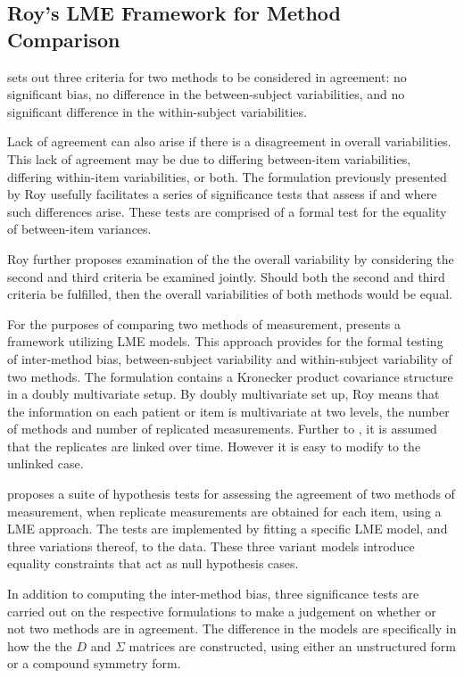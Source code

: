 \documentclass[12pt, a4paper]{report}
\theoremstyle{plain}
\theoremstyle{definition}
\theoremstyle{remark}
\begin{document}
\subsection{Roy's LME Framework for Method Comparison }
\citet{Barnhart} sets out three criteria for two methods to be considered in agreement: no significant bias, no difference in the between-subject variabilities, and no significant difference in the within-subject variabilities. 


Lack of agreement can also arise if there is a disagreement in overall variabilities. This lack of agreement may be due to differing between-item variabilities, differing within-item variabilities, or both. The formulation previously presented by Roy usefully facilitates a series of significance tests that assess if and where such differences arise. These tests are comprised of a formal test for the equality of between-item variances. 

Roy further proposes examination of the the overall variability by considering the second and third criteria be examined jointly. Should both the second and third criteria be fulfilled, then the overall variabilities of both methods would be equal.

For the purposes of comparing two methods of measurement, \citet{ARoy2009} presents a framework utilizing LME models. This approach provides for the formal testing of inter-method bias, between-subject variability and within-subject variability of two methods. The formulation contains a Kronecker product covariance structure in a doubly multivariate setup. By doubly multivariate set up, Roy means that the information on each patient or item is multivariate at two levels, the number of methods and number of replicated measurements. Further to \citet{lam}, it is assumed that the replicates are linked over time. However it is easy to modify to the unlinked case.

\citet{ARoy2009} proposes a suite of hypothesis tests for assessing the agreement of two methods of measurement, when replicate measurements are obtained for each item, using a LME approach. The tests are implemented by fitting a specific LME model, and three variations thereof, to the data. These three variant models introduce equality constraints that act as null hypothesis cases.

In addition to computing the inter-method bias, three significance tests are carried out on the respective formulations to make a judgement on whether or not two methods are in agreement. The difference in the models are specifically in how the the $D$ and $\Sigma$ matrices are constructed, using either an unstructured form or a compound symmetry form. 
\end{document}
